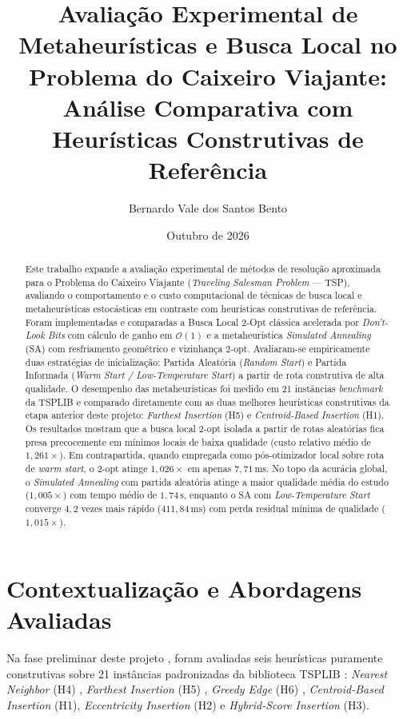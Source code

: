 \documentclass[12pt, a4paper]{article}
\title{\textbf{Avaliação Experimental de Metaheurísticas e Busca Local no Problema do Caixeiro Viajante: Análise Comparativa com Heurísticas Construtivas de Referência}}
\author{Bernardo Vale dos Santos Bento}
\date{Outubro de 2026}
\begin{document}
\maketitle

\begin{abstract}
Este trabalho expande a avaliação experimental de métodos de resolução aproximada para o Problema do Caixeiro Viajante (\textit{Traveling Salesman Problem} --- TSP), avaliando o comportamento e o custo computacional de técnicas de busca local e metaheurísticas estocásticas em contraste com heurísticas construtivas de referência. Foram implementadas e comparadas a Busca Local 2-Opt clássica acelerada por \textit{Don't-Look Bits} com cálculo de ganho em $\mathcal{O}(1)$ e a metaheurística \textit{Simulated Annealing} (SA) com resfriamento geométrico e vizinhança 2-opt. Avaliaram-se empiricamente duas estratégias de inicialização: Partida Aleatória (\textit{Random Start}) e Partida Informada (\textit{Warm Start / Low-Temperature Start}) a partir de rota construtiva de alta qualidade. O desempenho das metaheurísticas foi medido em 21 instâncias \textit{benchmark} da TSPLIB e comparado diretamente com as duas melhores heurísticas construtivas da etapa anterior deste projeto: \textit{Farthest Insertion} (H5) e \textit{Centroid-Based Insertion} (H1). Os resultados mostram que a busca local 2-opt isolada a partir de rotas aleatórias fica presa precocemente em mínimos locais de baixa qualidade (custo relativo médio de $1{,}261\times$). Em contrapartida, quando empregada como pós-otimizador local sobre rota de \textit{warm start}, o 2-opt atinge $1{,}026\times$ em apenas $7{,}71\,\mathrm{ms}$. No topo da acurácia global, o \textit{Simulated Annealing} com partida aleatória atinge a maior qualidade média do estudo ($1{,}005\times$) com tempo médio de $1{,}74\,\mathrm{s}$, enquanto o SA com \textit{Low-Temperature Start} converge $4{,}2$ vezes mais rápido ($411{,}84\,\mathrm{ms}$) com perda residual mínima de qualidade ($1{,}015\times$).
\end{abstract}

\section{Contextualização e Abordagens Avaliadas}

Na fase preliminar deste projeto \cite{bento2026}, foram avaliadas seis heurísticas puramente construtivas sobre 21 instâncias padronizadas da biblioteca TSPLIB \cite{reinelt1991}: \textit{Nearest Neighbor} (H4) \cite{rosenkrantz1977}, \textit{Farthest Insertion} (H5) \cite{rosenkrantz1977}, \textit{Greedy Edge} (H6) \cite{bentley1992}, \textit{Centroid-Based Insertion} (H1), \textit{Eccentricity Insertion} (H2) e \textit{Hybrid-Score Insertion} (H3).
\end{document}
